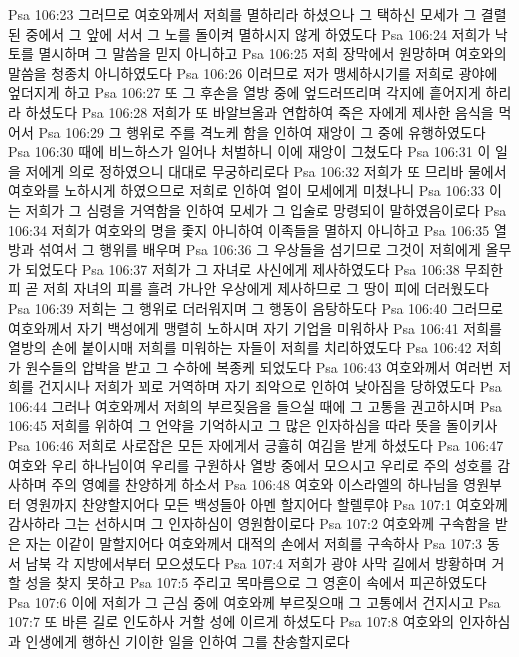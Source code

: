 Psa 106:23  그러므로 여호와께서 저희를 멸하리라 하셨으나 그 택하신 모세가 그 결렬된 중에서 그 앞에 서서 그 노를 돌이켜 멸하시지 않게 하였도다
Psa 106:24  저희가 낙토를 멸시하며 그 말씀을 믿지 아니하고
Psa 106:25  저희 장막에서 원망하며 여호와의 말씀을 청종치 아니하였도다
Psa 106:26  이러므로 저가 맹세하시기를 저희로 광야에 엎더지게 하고
Psa 106:27  또 그 후손을 열방 중에 엎드러뜨리며 각지에 흩어지게 하리라 하셨도다
Psa 106:28  저희가 또 바알브올과 연합하여 죽은 자에게 제사한 음식을 먹어서
Psa 106:29  그 행위로 주를 격노케 함을 인하여 재앙이 그 중에 유행하였도다
Psa 106:30  때에 비느하스가 일어나 처벌하니 이에 재앙이 그쳤도다
Psa 106:31  이 일을 저에게 의로 정하였으니 대대로 무궁하리로다
Psa 106:32  저희가 또 므리바 물에서 여호와를 노하시게 하였으므로 저희로 인하여 얼이 모세에게 미쳤나니
Psa 106:33  이는 저희가 그 심령을 거역함을 인하여 모세가 그 입술로 망령되이 말하였음이로다
Psa 106:34  저희가 여호와의 명을 좇지 아니하여 이족들을 멸하지 아니하고
Psa 106:35  열방과 섞여서 그 행위를 배우며
Psa 106:36  그 우상들을 섬기므로 그것이 저희에게 올무가 되었도다
Psa 106:37  저희가 그 자녀로 사신에게 제사하였도다
Psa 106:38  무죄한 피 곧 저희 자녀의 피를 흘려 가나안 우상에게 제사하므로 그 땅이 피에 더러웠도다
Psa 106:39  저희는 그 행위로 더러워지며 그 행동이 음탕하도다
Psa 106:40  그러므로 여호와께서 자기 백성에게 맹렬히 노하시며 자기 기업을 미워하사
Psa 106:41  저희를 열방의 손에 붙이시매 저희를 미워하는 자들이 저희를 치리하였도다
Psa 106:42  저희가 원수들의 압박을 받고 그 수하에 복종케 되었도다
Psa 106:43  여호와께서 여러번 저희를 건지시나 저희가 꾀로 거역하며 자기 죄악으로 인하여 낮아짐을 당하였도다
Psa 106:44  그러나 여호와께서 저희의 부르짖음을 들으실 때에 그 고통을 권고하시며
Psa 106:45  저희를 위하여 그 언약을 기억하시고 그 많은 인자하심을 따라 뜻을 돌이키사
Psa 106:46  저희로 사로잡은 모든 자에게서 긍휼히 여김을 받게 하셨도다
Psa 106:47  여호와 우리 하나님이여 우리를 구원하사 열방 중에서 모으시고 우리로 주의 성호를 감사하며 주의 영예를 찬양하게 하소서
Psa 106:48  여호와 이스라엘의 하나님을 영원부터 영원까지 찬양할지어다 모든 백성들아 아멘 할지어다 할렐루야
Psa 107:1  여호와께 감사하라 그는 선하시며 그 인자하심이 영원함이로다
Psa 107:2  여호와께 구속함을 받은 자는 이같이 말할지어다 여호와께서 대적의 손에서 저희를 구속하사
Psa 107:3  동서 남북 각 지방에서부터 모으셨도다
Psa 107:4  저희가 광야 사막 길에서 방황하며 거할 성을 찾지 못하고
Psa 107:5  주리고 목마름으로 그 영혼이 속에서 피곤하였도다
Psa 107:6  이에 저희가 그 근심 중에 여호와께 부르짖으매 그 고통에서 건지시고
Psa 107:7  또 바른 길로 인도하사 거할 성에 이르게 하셨도다
Psa 107:8  여호와의 인자하심과 인생에게 행하신 기이한 일을 인하여 그를 찬송할지로다
